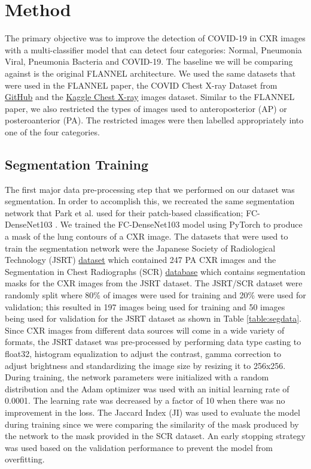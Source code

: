 \documentclass{sigkddExp}
\begin{document}
\section{Method}

The primary objective was to improve the detection of COVID-19 in CXR images
with a multi-classifier model that can detect four categories: Normal, Pneumonia
Viral, Pneumonia Bacteria and COVID-19. The baseline we will be comparing
against is the original FLANNEL architecture. We used the same datasets that
were used in the FLANNEL paper, the COVID Chest X-ray Dataset
\cite{cohen2020covidProspective} from
\href{https://github.com/ieee8023/covid-chestxray-dataset/tree/78543292f8b01d5e0ed1d0e15dce71949f0657bb}{GitHub} and the
\href{https://www.kaggle.com/paultimothymooney/chest-xray-pneumonia}{Kaggle
    Chest X-ray} images dataset. Similar to the FLANNEL paper, we also restricted
the types of images used to anteroposterior (AP) or posteroanterior (PA). The
restricted images were then labelled appropriately into one of the four
categories.

\subsection{Segmentation Training}
The first major data pre-processing step that we performed on our dataset was
segmentation. In order to accomplish this, we recreated the same segmentation
network that Park et al. used for their patch-based classification;
FC-DenseNet103 \cite{DBLP:journals/corr/JegouDVRB16}. We trained the
FC-DenseNet103 model using PyTorch to produce a mask of the lung contours of a
CXR image. The datasets that were used to train the segmentation network were
the Japanese Society of Radiological Technology (JSRT)
\href{http://db.jsrt.or.jp/eng.php}{dataset} which contained 247 PA CXR images
and the Segmentation in Chest Radiographs (SCR)
\href{https://www.isi.uu.nl/Research/Databases/SCR/}{database} which contains
segmentation masks for the CXR images from the JSRT dataset. The JSRT/SCR
dataset were randomly split where 80\% of images were used for training and 20\%
were used for validation; this resulted in 197 images being used for training
and 50 images being used for validation for the JSRT dataset as shown in Table
\ref{table:segdata}. Since CXR images from different data sources will come in a
wide variety of formats, the JSRT dataset was pre-processed by performing data
type casting to float32, histogram equalization to adjust the contrast, gamma
correction to adjust brightness and standardizing the image size by resizing it
to 256x256. During training, the network parameters were initialized with a
random distribution and the Adam optimizer was used with an initial learning
rate of 0.0001. The learning rate was decreased by a factor of 10 when there was
no improvement in the loss. The Jaccard Index (JI) was used to evaluate the
model during training since we were comparing the similarity of the mask
produced by the network to the mask provided in the SCR dataset. An early
stopping strategy was used based on the validation performance to prevent the
model from overfitting.
\end{document}
